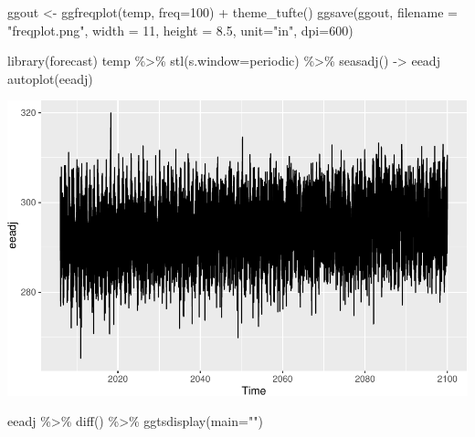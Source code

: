 \documentclass[
  paper=a4,
  ,captions=tableheading
]{scrartcl}
\newenvironment{Shaded}{\begin{snugshade}}{\end{snugshade}}
\newcommand{\AttributeTok}[1]{\textcolor[rgb]{0.77,0.63,0.00}{#1}}
\newcommand{\DecValTok}[1]{\textcolor[rgb]{0.00,0.00,0.81}{#1}}
\newcommand{\FloatTok}[1]{\textcolor[rgb]{0.00,0.00,0.81}{#1}}
\newcommand{\FunctionTok}[1]{\textcolor[rgb]{0.00,0.00,0.00}{#1}}
\newcommand{\NormalTok}[1]{#1}
\newcommand{\OtherTok}[1]{\textcolor[rgb]{0.56,0.35,0.01}{#1}}
\newcommand{\SpecialCharTok}[1]{\textcolor[rgb]{0.00,0.00,0.00}{#1}}
\newcommand{\StringTok}[1]{\textcolor[rgb]{0.31,0.60,0.02}{#1}}
\begin{document}
\begin{Shaded}
\begin{Highlighting}[]
\NormalTok{ggout }\OtherTok{\textless{}{-}} \FunctionTok{ggfreqplot}\NormalTok{(temp, }\AttributeTok{freq=}\DecValTok{100}\NormalTok{) }\SpecialCharTok{+}
  \FunctionTok{theme\_tufte}\NormalTok{() }
\FunctionTok{ggsave}\NormalTok{(ggout, }\AttributeTok{filename =} \StringTok{"freqplot.png"}\NormalTok{, }\AttributeTok{width =} \DecValTok{11}\NormalTok{, }\AttributeTok{height =} \FloatTok{8.5}\NormalTok{, }\AttributeTok{unit=}\StringTok{"in"}\NormalTok{, }\AttributeTok{dpi=}\DecValTok{600}\NormalTok{)}
\end{Highlighting}
\end{Shaded}

\begin{Shaded}
\begin{Highlighting}[]
\FunctionTok{library}\NormalTok{(forecast)}
\NormalTok{temp }\SpecialCharTok{\%\textgreater{}\%} \FunctionTok{stl}\NormalTok{(}\AttributeTok{s.window=}\StringTok{\textquotesingle{}periodic\textquotesingle{}}\NormalTok{) }\SpecialCharTok{\%\textgreater{}\%} \FunctionTok{seasadj}\NormalTok{() }\OtherTok{{-}\textgreater{}}\NormalTok{ eeadj}
\FunctionTok{autoplot}\NormalTok{(eeadj)}
\end{Highlighting}
\end{Shaded}

\includegraphics{Haskell_files/figure-latex/unnamed-chunk-66-1.pdf}

\begin{Shaded}
\begin{Highlighting}[]
\NormalTok{eeadj }\SpecialCharTok{\%\textgreater{}\%} \FunctionTok{diff}\NormalTok{() }\SpecialCharTok{\%\textgreater{}\%} \FunctionTok{ggtsdisplay}\NormalTok{(}\AttributeTok{main=}\StringTok{""}\NormalTok{)}
\end{Highlighting}
\end{Shaded}
\end{document}
